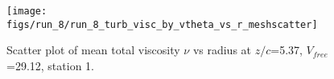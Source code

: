 \begin{figure}[H]
\centering
\texttt{[image: figs/run\_8/run\_8\_turb\_visc\_by\_vtheta\_vs\_r\_meshscatter]}
\caption{Scatter plot of mean total viscosity $\nu$ vs radius at $z/c$=5.37, $V_{free}$=29.12, station 1.}
\label{fig:run_8_turb_visc_by_vtheta_vs_r_meshscatter}
\end{figure}


